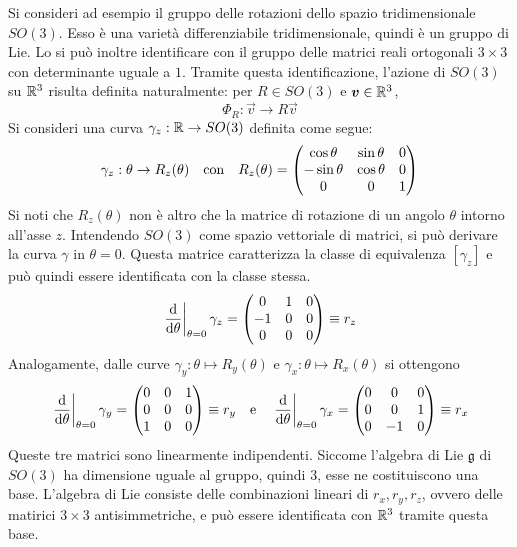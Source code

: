 Si consideri ad esempio il gruppo delle rotazioni dello spazio tridimensionale $SO(3)$. Esso è una varietà differenziabile tridimensionale, quindi è un gruppo di Lie. Lo si può inoltre identificare con il gruppo delle matrici reali ortogonali $3\times 3$ con determinante uguale a $1$. Tramite questa identificazione, l'azione di $SO(3)$ su $\mathbb{R}^3$ risulta definita naturalmente: per $R \in SO(3)$ e $\boldsymbol{v} \in \mathbb{R}^3$, 
\begin{equation*}
\Phi_R: \vec{v}\to R\vec{v}
\end{equation*} 
Si consideri una curva $\gamma_z: \mathbb{R} \to SO(3)$ definita come segue:
\begin{equation*}
\gamma_z: \theta \to R_z(\theta) \qqtext{con} R_z(\theta) = \pmqty{\cos \theta & \sin \theta & 0 \\ -\sin \theta & \cos \theta & 0 \\ 0 & 0 & 1}
\end{equation*}
Si noti che $R_z(\theta)$ non è altro che la matrice di rotazione di un angolo $\theta$ intorno all'asse $z$. Intendendo $SO(3)$ come spazio vettoriale di matrici, si può derivare la curva $\gamma$ in $\theta=0$. Questa matrice caratterizza la classe di equivalenza $[\gamma_z]$ e può quindi essere identificata con la classe stessa. 
\begin{equation*}
\eval{\dv{\theta}}_{\theta=0}\gamma_z = \pmqty{0 & 1 & 0 \\ -1 & 0 & 0 \\ 0 & 0 & 0} \defeq r_z
\end{equation*}
Analogamente, dalle curve $\gamma_y: \theta\mapsto R_y(\theta)$ e $\gamma_x: \theta \mapsto R_x(\theta)$ si ottengono 
\begin{equation*}
  \eval{\dv{\theta}}_{\theta=0}\gamma_y = \pmqty{0 & 0 & 1 \\ 0 & 0 & 0 \\ 1 & 0 & 0} \defeq r_y \qqtext{e} \eval{\dv{\theta}}_{\theta=0}\gamma_x = \pmqty{0 & 0 & 0 \\ 0 & 0 & 1 \\ 0 & -1 & 0} \defeq r_x
\end{equation*}
Queste tre matrici sono linearmente indipendenti. Siccome l'algebra di Lie $\mathfrak{g}$ di $SO(3)$ ha dimensione uguale al gruppo, quindi $3$, esse ne costituiscono una base. L'algebra di Lie consiste delle combinazioni lineari di $r_x, r_y, r_z$, ovvero delle matirici $3\times 3$ antisimmetriche, e può essere identificata con $\mathbb{R}^3$ tramite questa base. 

